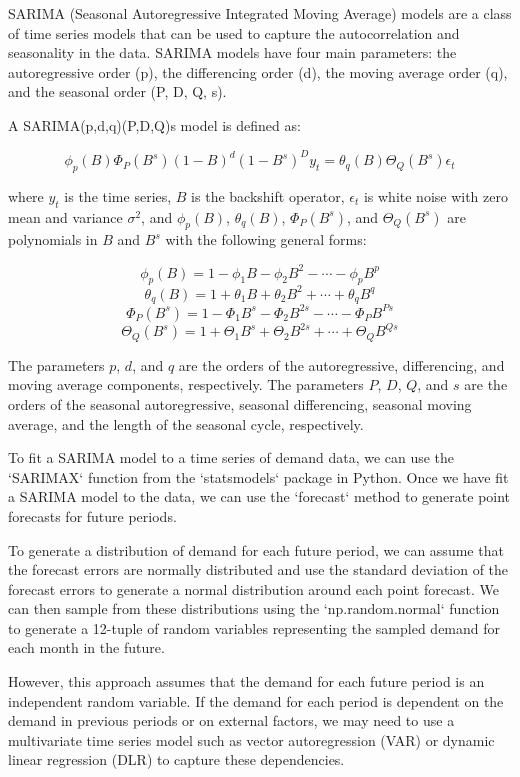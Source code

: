 SARIMA (Seasonal Autoregressive Integrated Moving Average) models are a class of time series models that can be used to capture the autocorrelation and seasonality in the data. SARIMA models have four main parameters: the autoregressive order (p), the differencing order (d), the moving average order (q), and the seasonal order (P, D, Q, s).

A SARIMA(p,d,q)(P,D,Q)s model is defined as:

$$\phi_p(B)\Phi_P(B^s)(1-B)^d(1-B^s)^Dy_t=\theta_q(B)\Theta_Q(B^s)\epsilon_t$$

where $y_t$ is the time series, $B$ is the backshift operator, $\epsilon_t$ is white noise with zero mean and variance $\sigma^2$, and $\phi_p(B)$, $\theta_q(B)$, $\Phi_P(B^s)$, and $\Theta_Q(B^s)$ are polynomials in $B$ and $B^s$ with the following general forms:

$$\phi_p(B) = 1 - \phi_1B - \phi_2B^2 - \cdots - \phi_pB^p$$
$$\theta_q(B) = 1 + \theta_1B + \theta_2B^2 + \cdots + \theta_qB^q$$
$$\Phi_P(B^s) = 1 - \Phi_1B^s - \Phi_2B^{2s} - \cdots - \Phi_PB^{Ps}$$
$$\Theta_Q(B^s) = 1 + \Theta_1B^s + \Theta_2B^{2s} + \cdots + \Theta_QB^{Qs}$$

The parameters $p$, $d$, and $q$ are the orders of the autoregressive, differencing, and moving average components, respectively. The parameters $P$, $D$, $Q$, and $s$ are the orders of the seasonal autoregressive, seasonal differencing, seasonal moving average, and the length of the seasonal cycle, respectively.

To fit a SARIMA model to a time series of demand data, we can use the `SARIMAX` function from the `statsmodels` package in Python. Once we have fit a SARIMA model to the data, we can use the `forecast` method to generate point forecasts for future periods. 

To generate a distribution of demand for each future period, we can assume that the forecast errors are normally distributed and use the standard deviation of the forecast errors to generate a normal distribution around each point forecast. We can then sample from these distributions using the `np.random.normal` function to generate a 12-tuple of random variables representing the sampled demand for each month in the future.

However, this approach assumes that the demand for each future period is an independent random variable. If the demand for each period is dependent on the demand in previous periods or on external factors, we may need to use a multivariate time series model such as vector autoregression (VAR) or dynamic linear regression (DLR) to capture these dependencies.


